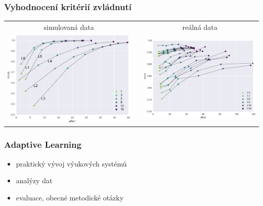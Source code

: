 \documentclass[bigger]{beamer}
\begin{document}
\begin{frame}
  \frametitle{Vyhodnocení kritérií zvládnutí}

  \begin{center}
    \begin{tabular}{ccc}
      simulovaná data & & reálná data \\
      \includegraphics[width=.45\linewidth]{ncc-effort-score} & &
      \includegraphics[width=.45\linewidth]{uc-effort-score}
    \end{tabular}
  \end{center}
\end{frame}

\begin{frame}
  \frametitle{Adaptive Learning}

  \begin{itemize}
  \item praktický vývoj výukových systémů
  \item analýzy dat
  \item evaluace, obecné metodické otázky
  \end{itemize}
\end{frame}
\end{document}
